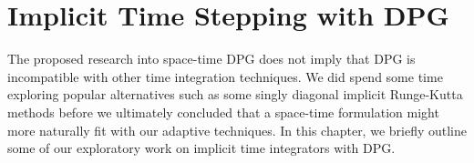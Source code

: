 \documentclass[Proposal.tex]{subfiles}
\begin{document}
\chapter{Implicit Time Stepping with DPG}
The proposed research into space-time DPG does not imply that DPG is incompatible with other time integration techniques. 
We did spend some time exploring popular alternatives such as some singly diagonal implicit Runge-Kutta methods 
before we ultimately concluded that a space-time formulation might more naturally fit with our adaptive techniques.
In this chapter, we briefly outline some of our exploratory work on implicit time integrators with DPG.
\end{document}
